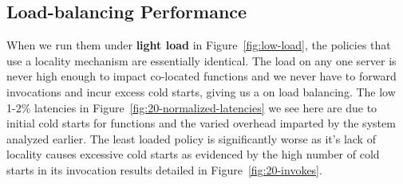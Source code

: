 \subsection{Load-balancing Performance}
\label{sec:policy-comare}








When we run them under \textbf{light load} in Figure~\ref{fig:low-load}, the policies that use a locality mechanism are essentially identical.
The load on any one server is never high enough to impact co-located functions and we never have to forward invocations and incur excess cold starts, giving us a  on load balancing.
The low 1-2\% latencies in Figure~\ref{fig:20-normalized-latencies} we see here are due to initial cold starts for functions and the varied overhead imparted by the system analyzed earlier.
The least loaded policy is significantly worse as it's lack of locality causes excessive cold starts as evidenced by the high number of cold starts in its invocation results detailed in Figure~\ref{fig:20-invokes}.



